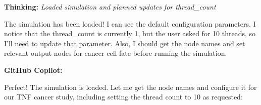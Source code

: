 \documentclass[11pt,a4paper]{article}
\begin{document}
\begin{thinkbox}
\textbf{Thinking:} \textit{Loaded simulation and planned updates for thread\_count}

The simulation has been loaded! I can see the default configuration parameters. I notice that the thread\_count is currently 1, but the user asked for 10 threads, so I'll need to update that parameter. Also, I should get the node names and set relevant output nodes for cancer cell fate before running the simulation.

\end{thinkbox}
\begin{copilotbox}
\textbf{GitHub Copilot:}

Perfect! The simulation is loaded. Let me get the node names and configure it for our TNF cancer study, including setting the thread count to 10 as requested:

\end{copilotbox}
\end{document}
